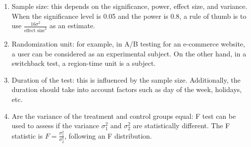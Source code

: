             \begin{enumerate}
                \item Sample size: this depends on the significance, power, effect size, and variance. When the significance level is 0.05 and the power is 0.8, a rule of thumb is to use $\frac{16 \sigma^2}{\text{effect size}^2}$ as an estimate.

                \item Randomization unit: for example, in A/B testing for an e-commerce website, a user can be considered as an experimental subject. On the other hand, in a switchback test, a region-time unit is a subject.
                
                \item Duration of the test: this is influenced by the sample size. Additionally, the duration should take into account factors such as day of the week, holidays, etc.

                \item Are the variance of the treatment and control groups equal: F test can be used to assess if the variance $\sigma_1^2$ and $\sigma_2^2$ are statistically different. The F statistic is $F = \frac{\sigma_1^2}{\sigma_2^2}$, following an F distribution. 
                

\end{enumerate}
